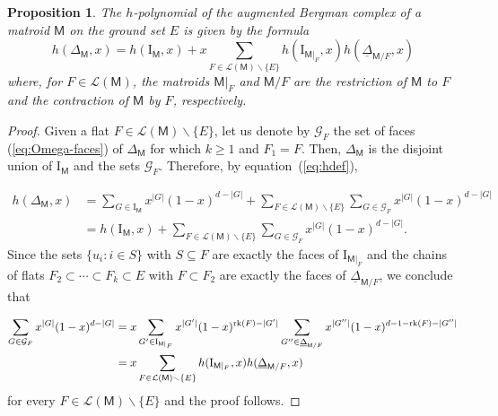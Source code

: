 \documentclass[11pt]{amsart}
\theoremstyle{theorems}
\newtheorem{proposition}[theorem]{Proposition}
\theoremstyle{definition}
\newcommand{\rk}{{\rm rk}}
\newcommand{\gG}{{\mathcal G}}
\newcommand{\lL}{{\mathcal L}}
\newcommand{\M}{{\mathsf{M}}}
\newcommand{\I}{{\mathrm{I}}}
\newcommand{\uDelta}{\underline{\Delta}}
\newcommand{\sm}{{\smallsetminus}}
\begin{document}
\begin{proposition} \label{prop:hOmega}
The $h$-polynomial of the augmented Bergman complex of a matroid $\M$ 
on the ground set $E$ is given by the formula
%
\begin{equation} \label{eq:hOmega}
h(\Delta_{\M}, x) = h(\I_{\M},x) + x
  \sum_{F \in \lL(\M) \sm \{E\}} h(\I_{\M|_F},x) 
	                              h(\uDelta_{\M/F},x)
\end{equation}
% 
where, for $F \in \lL(\M)$, the matroids $\M|_F$ and $\M/F$ are the 
restriction of $\M$ to $F$ and the contraction of $\M$ by $F$, 
respectively.
\end{proposition}



\begin{proof}
Given a flat $F \in \lL(\M) \sm \{E\}$, let us denote by $\gG_F$ the 
set of faces (\ref{eq:Omega-faces}) of $\Delta_{\M}$ for which 
$k \ge 1$ and $F_1 = F$. Then, $\Delta_{\M}$ is the disjoint union 
of $\I_{\M}$ and the sets $\gG_F$. Therefore, by 
equation~(\ref{eq:hdef}),

\begin{align*} 
  h(\Delta_{\M}, x) & = \sum_{G \in \I_{\M}} x^{|G|} 
  (1-x)^{d-|G|} + \sum_{F \in \lL(\M) \sm \{E\}} 
	\sum_{G \in \gG_F} x^{|G|} (1-x)^{d-|G|} 
	\\ & = h(\I_{\M},x) + \sum_{F \in \lL(\M) \sm \{E\}} 
	\sum_{G \in \gG_F} x^{|G|} (1-x)^{d-|G|}. 
\end{align*}
%
Since the sets $\{u_i : i \in S \}$ with $S \subseteq F$ are exactly 
the faces of $\I_{\M|_F}$ and the chains of flats $F_2 \subset \cdots 
\subset F_k \subset E$ with $F \subset F_2$ are exactly the faces of 
$\uDelta_{\M/F}$, we conclude that 

\begin{align*} 
\sum_{G \in \gG_F} x^{|G|} (1-x)^{d-|G|} & = 
x \sum_{G' \in \I_{\M|_F}} x^{|G'|} (1-x)^{\rk(F)-|G'|} 
\sum_{G'' \in \uDelta_{\M/F}} x^{|G''|} 
            (1-x)^{d-1-\rk(F)-|G''|}
\\ & = x \sum_{F \in \lL(\M) \sm \{E\}} 
	       h(\I_{\M|_F},x) h(\uDelta_{\M/F},x)
\end{align*}
%
for every $F \in \lL(\M) \sm \{E\}$ and the proof follows.
\end{proof}
\end{document}
